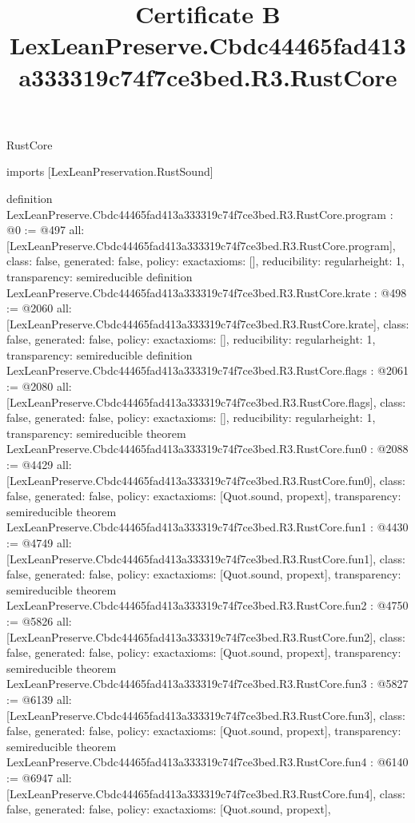 \begin{lexlean}{RustCore}
\title{Certificate B LexLeanPreserve.Cbdc44465fad413a333319c74f7ce3bed.R3.RustCore}
\begin{coremodule}
imports [LexLeanPreservation.RustSound]

definition LexLeanPreserve.Cbdc44465fad413a333319c74f7ce3bed.R3.RustCore.program : @0 := @497 {
  all: [LexLeanPreserve.Cbdc44465fad413a333319c74f7ce3bed.R3.RustCore.program],
  class: false,
  generated: false,
  policy: exact{axioms: []},
  reducibility: regular{height: 1},
  transparency: semireducible
}
definition LexLeanPreserve.Cbdc44465fad413a333319c74f7ce3bed.R3.RustCore.krate : @498 := @2060 {
  all: [LexLeanPreserve.Cbdc44465fad413a333319c74f7ce3bed.R3.RustCore.krate],
  class: false,
  generated: false,
  policy: exact{axioms: []},
  reducibility: regular{height: 1},
  transparency: semireducible
}
definition LexLeanPreserve.Cbdc44465fad413a333319c74f7ce3bed.R3.RustCore.flags : @2061 := @2080 {
  all: [LexLeanPreserve.Cbdc44465fad413a333319c74f7ce3bed.R3.RustCore.flags],
  class: false,
  generated: false,
  policy: exact{axioms: []},
  reducibility: regular{height: 1},
  transparency: semireducible
}
theorem LexLeanPreserve.Cbdc44465fad413a333319c74f7ce3bed.R3.RustCore.fun0 : @2088 := @4429 {
  all: [LexLeanPreserve.Cbdc44465fad413a333319c74f7ce3bed.R3.RustCore.fun0],
  class: false,
  generated: false,
  policy: exact{axioms: [Quot.sound, propext]},
  transparency: semireducible
}
theorem LexLeanPreserve.Cbdc44465fad413a333319c74f7ce3bed.R3.RustCore.fun1 : @4430 := @4749 {
  all: [LexLeanPreserve.Cbdc44465fad413a333319c74f7ce3bed.R3.RustCore.fun1],
  class: false,
  generated: false,
  policy: exact{axioms: [Quot.sound, propext]},
  transparency: semireducible
}
theorem LexLeanPreserve.Cbdc44465fad413a333319c74f7ce3bed.R3.RustCore.fun2 : @4750 := @5826 {
  all: [LexLeanPreserve.Cbdc44465fad413a333319c74f7ce3bed.R3.RustCore.fun2],
  class: false,
  generated: false,
  policy: exact{axioms: [Quot.sound, propext]},
  transparency: semireducible
}
theorem LexLeanPreserve.Cbdc44465fad413a333319c74f7ce3bed.R3.RustCore.fun3 : @5827 := @6139 {
  all: [LexLeanPreserve.Cbdc44465fad413a333319c74f7ce3bed.R3.RustCore.fun3],
  class: false,
  generated: false,
  policy: exact{axioms: [Quot.sound, propext]},
  transparency: semireducible
}
theorem LexLeanPreserve.Cbdc44465fad413a333319c74f7ce3bed.R3.RustCore.fun4 : @6140 := @6947 {
  all: [LexLeanPreserve.Cbdc44465fad413a333319c74f7ce3bed.R3.RustCore.fun4],
  class: false,
  generated: false,
  policy: exact{axioms: [Quot.sound, propext]},
}
\end{coremodule}
\end{lexlean}
